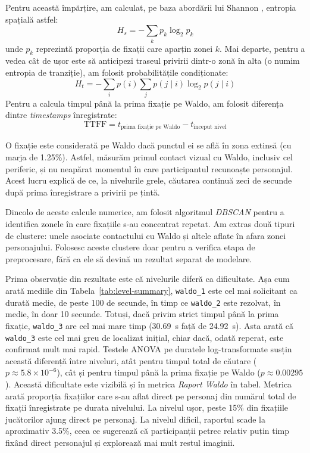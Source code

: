 Pentru această împărțire, am calculat, pe baza abordării lui Shannon \cite{shannon1948}, entropia spațială astfel:
$$H_s = - \sum_k p_k \log_2 p_k$$
unde $p_k$ reprezintă proporția de fixații care aparțin zonei $k$. Mai departe, pentru a vedea cât de ușor este să anticipezi traseul privirii dintr-o zonă în alta (o numim entropia de tranziție), am folosit probabilitățile condiționate:
$$H_t = - \sum_i p(i) \sum_j p(j \mid i)\log_2 p(j \mid i)$$
Pentru a calcula timpul până la prima fixație pe Waldo, am folosit diferența dintre \emph{timestamps} înregistrate:
$$\mathrm{TTFF} = t_{\text{prima fixație pe Waldo}} - t_{\text{început nivel}}$$

O fixație este considerată pe Waldo dacă punctul ei se află în zona extinsă (cu marja de 1.25\%). Astfel, măsurăm primul contact vizual cu Waldo, inclusiv cel periferic, și nu neapărat momentul în care participantul recunoaște personajul. Acest lucru explică de ce, la nivelurile grele, căutarea continuă zeci de secunde după prima înregistrare a privirii pe țintă.

Dincolo de aceste calcule numerice, am folosit algoritmul \emph{DBSCAN} \cite{ester1996dbscan} pentru a identifica zonele în care fixațiile s-au concentrat repetat. Am extras două tipuri de clustere: unele asociate contactului cu Waldo și altele aflate în afara zonei personajului. Folosesc aceste clustere doar pentru a verifica etapa de preprocesare, fără ca ele să devină un rezultat separat de modelare.


Prima observație din rezultate este că nivelurile diferă ca dificultate. Așa cum arată mediile din Tabela~\ref{tab:level-summary}, \texttt{waldo\_1} este cel mai solicitant ca durată medie, de peste 100 de secunde, în timp ce \texttt{waldo\_2} este rezolvat, în medie, în doar 10 secunde. Totuși, dacă privim strict timpul până la prima fixație, \texttt{waldo\_3} are cel mai mare timp (30.69~s față de 24.92~s). Asta arată că \texttt{waldo\_3} este cel mai greu de localizat inițial, chiar dacă, odată reperat, este confirmat mult mai rapid. Testele ANOVA pe duratele log-transformate susțin această diferență între niveluri, atât pentru timpul total de căutare ($p \approx 5.8 \times 10^{-6}$), cât și pentru timpul până la prima fixație pe Waldo ($p \approx 0.00295$). Această dificultate este vizibilă și în metrica \emph{Raport Waldo} în tabel. Metrica arată proporția fixațiilor care s-au aflat direct pe personaj din numărul total de fixații înregistrate pe durata nivelului. La nivelul ușor, peste 15\% din fixațiile jucătorilor ajung direct pe personaj. La nivelul dificil, raportul scade la aproximativ 3.5\%, ceea ce sugerează că participanții petrec relativ puțin timp fixând direct personajul și explorează mai mult restul imaginii.

